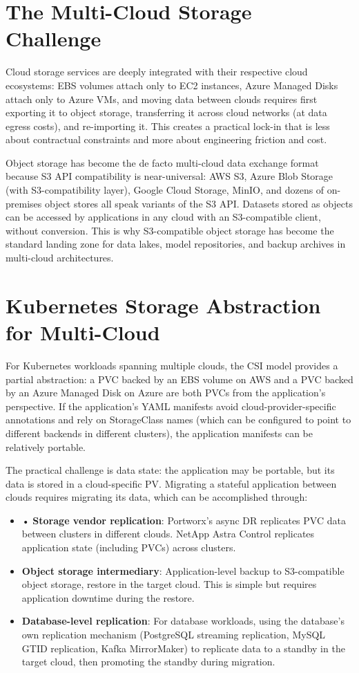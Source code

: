 \section{The Multi-Cloud Storage Challenge}
Cloud storage services are deeply integrated with their respective cloud ecosystems: EBS volumes attach only to EC2 instances, Azure Managed Disks attach only to Azure VMs, and moving data between clouds requires first exporting it to object storage, transferring it across cloud networks (at data egress costs), and re-importing it. This creates a practical lock-in that is less about contractual constraints and more about engineering friction and cost.

Object storage has become the de facto multi-cloud data exchange format because S3 API compatibility is near-universal: AWS S3, Azure Blob Storage (with S3-compatibility layer), Google Cloud Storage, MinIO, and dozens of on-premises object stores all speak variants of the S3 API. Datasets stored as objects can be accessed by applications in any cloud with an S3-compatible client, without conversion. This is why S3-compatible object storage has become the standard landing zone for data lakes, model repositories, and backup archives in multi-cloud architectures.

\section{Kubernetes Storage Abstraction for Multi-Cloud}
For Kubernetes workloads spanning multiple clouds, the CSI model provides a partial abstraction: a PVC backed by an EBS volume on AWS and a PVC backed by an Azure Managed Disk on Azure are both PVCs from the application's perspective. If the application's YAML manifests avoid cloud-provider-specific annotations and rely on StorageClass names (which can be configured to point to different backends in different clusters), the application manifests can be relatively portable.

The practical challenge is data state: the application may be portable, but its data is stored in a cloud-specific PV. Migrating a stateful application between clouds requires migrating its data, which can be accomplished through:

\begin{itemize}
  \item • \textbf{Storage vendor replication}: Portworx's async DR replicates PVC data between clusters in different clouds. NetApp Astra Control replicates application state (including PVCs) across clusters.
  \item \textbf{Object storage intermediary}: Application-level backup to S3-compatible object storage, restore in the target cloud. This is simple but requires application downtime during the restore.
  \item \textbf{Database-level replication}: For database workloads, using the database's own replication mechanism (PostgreSQL streaming replication, MySQL GTID replication, Kafka MirrorMaker) to replicate data to a standby in the target cloud, then promoting the standby during migration.
\end{itemize}

